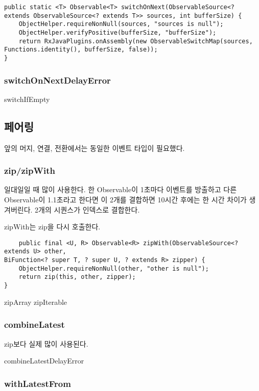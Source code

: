 \documentclass{book}
\begin{document}
{\begin{verbatim}
public static <T> Observable<T> switchOnNext(ObservableSource<? extends ObservableSource<? extends T>> sources, int bufferSize) {
	ObjectHelper.requireNonNull(sources, "sources is null");
	ObjectHelper.verifyPositive(bufferSize, "bufferSize");
	return RxJavaPlugins.onAssembly(new ObservableSwitchMap(sources, Functions.identity(), bufferSize, false));
}
\end{verbatim}

\subsubsection{switchOnNextDelayError}

switchIfEmpty


\subsection{페어링}
앞의 머지, 연결, 전환에서는 동일한 이벤트 타입이 필요했다.

\subsubsection{zip/zipWith}
일대일일 때 많이 사용한다.
한 Observable이 1초마다 이벤트를 방출하고 다른 Observable이 1.1초라고 한다면 이 2개를 결합하면 10시간 후에는 한 시간 차이가 생겨버린다.
2개의 시퀀스가 인덱스로 결합한다.

zipWith는 zip을 다시 호출한다.
\begin{verbatim}
    public final <U, R> Observable<R> zipWith(ObservableSource<? extends U> other,
BiFunction<? super T, ? super U, ? extends R> zipper) {
	ObjectHelper.requireNonNull(other, "other is null");
	return zip(this, other, zipper);
}
\end{verbatim}

zipArray
zipIterable

\subsubsection{combineLatest}
zip보다 실제 많이 사용된다.

combineLatestDelayError

\subsubsection{withLatestFrom}

}
\end{document}
